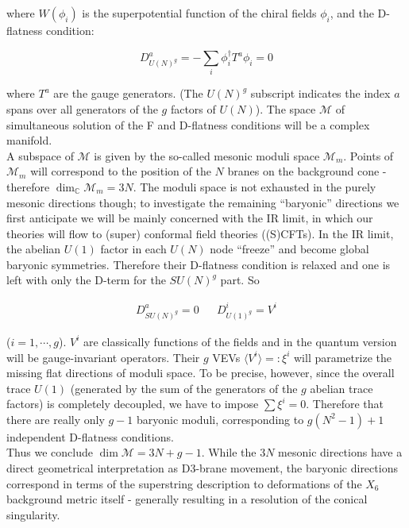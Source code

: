 where $W(\phi_i)$ is the superpotential function of the chiral fields $\phi_i$, and the D-flatness condition:

\begin{equation}
	D^a_{U(N)^g} = - \sum_i \phi_i^\dagger T^a \phi_i = 0
\end{equation}

where $T^a$ are the gauge generators. (The $U(N)^g$ subscript indicates the index $a$ spans over all generators of the $g$ factors of $U(N)$). The space $\mathcal{M}$ of simultaneous solution of the F and D-flatness conditions will be a complex manifold.\\

A subspace of $\mathcal{M}$ is given by the so-called mesonic moduli space $\mathcal{M}_m$. Points of $\mathcal{M}_m$ will correspond to the position of the $N$ branes on the background cone - therefore $\dim_\mathbb{C} \mathcal{M}_m = 3N$. The moduli space is not exhausted in the purely mesonic directions though; to investigate the remaining ``baryonic'' directions we first anticipate we will be mainly concerned with the IR limit, in which our theories will flow to (super) conformal field theories ((S)CFTs). In the IR limit, the abelian $U(1)$ factor in each $U(N)$ node ``freeze'' and become global baryonic symmetries. Therefore their D-flatness condition is relaxed and one is left with only the D-term for the $SU(N)^g$ part. So

\begin{align}
	D^a_{SU(N)^g} = 0 && D^i_{U(1)^g} = V^i
	\label{}
\end{align}

($i=1,\cdots,g$). $V^i$ are classically functions of the fields and in the quantum version will be gauge-invariant operators. Their $g$ VEVs $\langle V^i \rangle =: \xi^i$ will parametrize the missing flat directions of moduli space. To be precise, however, since the overall trace $U(1)$ (generated by the sum of the generators of the $g$ abelian trace factors) is completely decoupled, we have to impose $\sum \xi^i = 0$. Therefore that there are really only $g-1$ baryonic moduli, corresponding to $g(N^2-1)+1$ independent D-flatness conditions.\\

Thus we conclude $\dim \mathcal M = 3N + g - 1$. While the $3N$ mesonic directions have a direct geometrical interpretation as D3-brane movement, the baryonic directions correspond in terms of the superstring description to deformations of the $X_6$ background metric itself - generally resulting in a resolution of the conical singularity.

